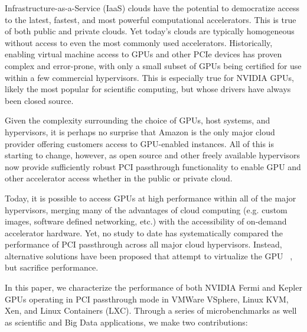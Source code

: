 

 Infrastructure-as-a-Service (IaaS) clouds have the potential to
democratize access to the latest, fastest, and most powerful computational
accelerators.  This is true of both public and private clouds.  Yet today's
clouds are typically homogeneous without access to even the most commonly used
accelerators.  Historically, enabling virtual machine access to GPUs and other PCIe devices has
proven complex and error-prone, with only a small subset of GPUs being
certified for use within a few commercial hypervisors.  This is especially true
for NVIDIA GPUs, likely the most popular for scientific computing, but whose
drivers have always been closed source.  

Given the complexity surrounding the choice of GPUs, host systems, and
hypervisors, it is perhaps no surprise that Amazon is the only major cloud
provider offering customers access to GPU-enabled instances.  All of this is
starting to change, however, as open source and other freely available
hypervisors now provide sufficiently robust PCI passthrough functionality to
enable GPU and other accelerator access whether in the public or private cloud.

Today, it is possible to access GPUs at high performance within all of
the major hypervisors, merging many of the advantages of cloud computing (e.g. custom
images, software defined networking, etc.)  with
the accessibility of on-demand accelerator hardware.  Yet, no study to date has
systematically compared the performance of PCI passthrough across all major
cloud hypervisors.  Instead, alternative solutions have been proposed that
attempt to virtualize the GPU~\cite{Duato2010rc}
, but sacrifice performance.


In this paper, we characterize the performance of both NVIDIA Fermi and Kepler GPUs
operating in PCI passthrough mode in VMWare VSphere, Linux KVM, Xen, and Linux
Containers (LXC).  Through a series of microbenchmarks as well as scientific and
Big Data applications, we make two contributions: 


